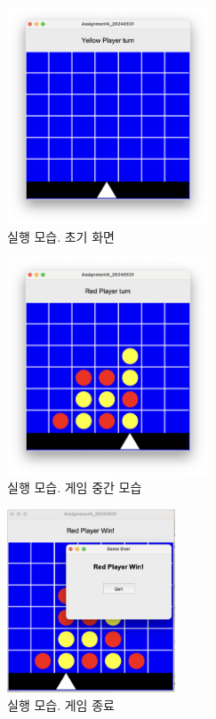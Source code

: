 \documentclass{article}
\begin{document}
\begin{figure}
  \begin{center}
    \includegraphics[width=6cm]{assets/screenshots/initial.png}
    \caption{실행 모습. 초기 화면}
    \label{img:1}
  \end{center}
\end{figure}
\begin{figure}
  \begin{center}
    \includegraphics[width=6cm]{assets/screenshots/mid.png}
    \caption{실행 모습. 게임 중간 모습}
    \label{img:2}
  \end{center}
\end{figure}
\begin{figure}
  \begin{center}
    \includegraphics[width=5cm]{assets/screenshots/end.png}
    \caption{실행 모습. 게임 종료}
    \label{img:3}
  \end{center}
\end{figure}
\end{document}
